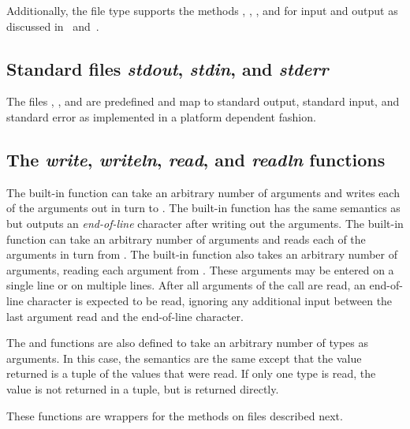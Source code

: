 Additionally, the file type supports the
methods , , , and  for 
input and output as discussed in~ and~.

\subsection{Standard files {\em stdout}, {\em stdin}, and {\em stderr}}

The files , , and  are
predefined and map to standard output, standard input, and standard
error as implemented in a platform dependent fashion.

\subsection{The {\em write}, {\em writeln}, {\em read}, and {\em readln} 
functions}

The built-in function  can take an arbitrary number of
arguments and writes each of the arguments out in turn
to .  The built-in function  has the same
semantics as  but outputs an {\em end-of-line} character
after writing out the arguments.  The built-in function 
can take an arbitrary number of arguments and reads each of the
arguments in turn from .  The built-in function 
also takes an arbitrary number of arguments, reading each argument from
.  These arguments may be entered on a single line or on multiple
lines.  After all arguments of the  call are read, an 
end-of-line character is expected to be read, ignoring any additional 
input between the last argument read and the end-of-line character.

The  and  functions are also defined to take
an arbitrary number of types as arguments.  In this case, the
semantics are the same except that the value returned is a tuple of
the values that were read.  If only one type is read, the value is not
returned in a tuple, but is returned directly.

These functions are wrappers for the methods on files described next.

